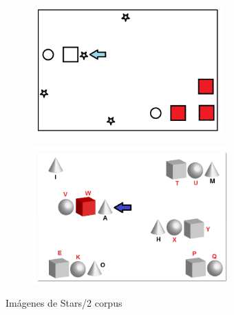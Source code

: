 \begin{figure}[!ht]
\begin{subfigure}{.5\textwidth}

\centering
\includegraphics[width=\textwidth]{images/STARS.png}\\[0pt]
\caption{}
\label{fig-STARS}
\end{subfigure}
\hspace*{0cm}
\begin{subfigure}{.5\textwidth}

\centering
\includegraphics[width=\textwidth]{images/STARS2.png}\\[0pt]
\caption{}
\label{fig-STARS2}
\end{subfigure}
\caption{Im\'agenes de Stars/2 corpus}\label{imagenes-stars-stars2}
\end{figure}


